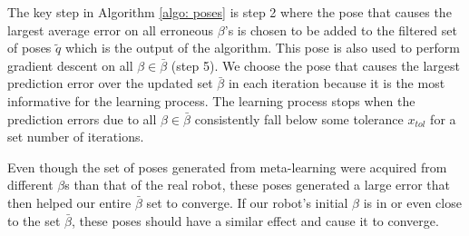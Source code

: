 \documentclass[letterpaper, 10 pt, conference]{ieeeconf}  %
\begin{document}
The key step in Algorithm \ref{algo: poses} is step 2 where the pose that causes the largest average error on all erroneous $\beta$'s is chosen to be added to the filtered set of poses $\widetilde{q}$ which is the output of the algorithm. This pose is also used to perform gradient descent on all $\beta \in \bar{\beta}$ (step 5). We choose the pose that causes the largest prediction error over the updated set $\bar\beta$ in each iteration because it is the most informative for the learning process. The learning process stops when the prediction errors due to all $\beta \in \bar{\beta}$ consistently fall below some tolerance $x_{tol}$ for a set number of iterations.



Even though the set of poses generated from meta-learning were acquired from different $\beta$s than that of the real robot, these poses generated a large error that then helped our entire $\bar{\beta}$ set to converge. If our robot's initial $\beta$ is in or even close to the set $\bar{\beta}$, these poses should have a similar effect and cause it to converge.




\end{document}
